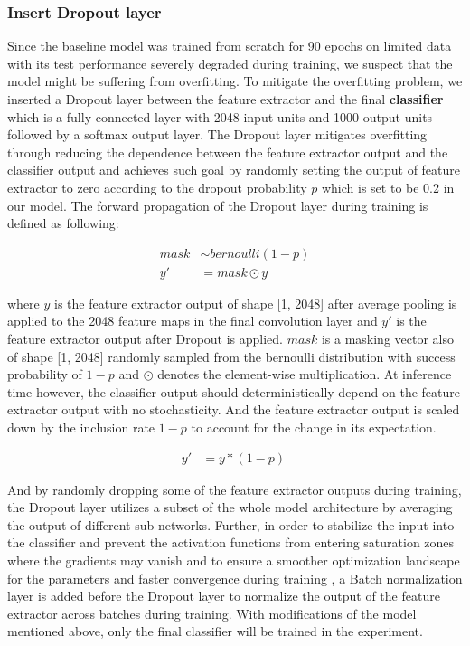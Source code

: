 \documentclass{article}
\begin{document}
\subsubsection{Insert Dropout layer}
Since the baseline model was trained from scratch for 90 epochs on limited data with its test performance severely degraded during training, we suspect that the model might be suffering from overfitting. To mitigate the overfitting problem, we inserted a Dropout layer\cite{srivastava2014dropout} between the feature extractor and the final \textbf{classifier} which is a fully connected layer with 2048 input units and 1000 output units followed by a softmax output layer.
The Dropout layer mitigates overfitting through reducing the dependence between the feature extractor output and the classifier output and achieves such goal by randomly setting the output of feature extractor to zero according to the dropout probability $p$ which is set to be 0.2 in our model. The forward propagation of the Dropout layer during training is defined as following:

\begin{align}
    mask &\sim bernoulli(1-p)\\
    y' &= mask \odot y\
\end{align}

where $y$ is the feature extractor output of shape [1, 2048] after average pooling is applied to the 2048 feature maps in the final convolution layer and $y'$ is the feature extractor output after Dropout is applied. $mask$ is a masking vector also of shape [1, 2048] randomly sampled from the bernoulli distribution with success probability of $1-p$
and $\odot$ denotes the element-wise multiplication.
At inference time however, the classifier output should deterministically depend on the feature extractor output with no stochasticity. And the feature extractor output is scaled down by the inclusion rate $1-p$ to account for the change in its expectation.

\begin{align}
    y' &= y*(1-p)\
\end{align}

And by randomly dropping some of the feature extractor outputs during training, the Dropout layer utilizes a subset of the whole model architecture by averaging the output of different sub networks.
Further, in order to stabilize the input into the classifier and prevent the activation functions from entering saturation zones where the gradients may vanish and to ensure a smoother optimization landscape for the parameters and faster convergence during training \cite{santurkar2018does}, a Batch normalization layer \cite{ioffe2015batch} is added before the Dropout layer to normalize the output of the feature extractor across batches during training. With modifications of the model mentioned above, only the final classifier will be trained in the experiment. 
\end{document}
